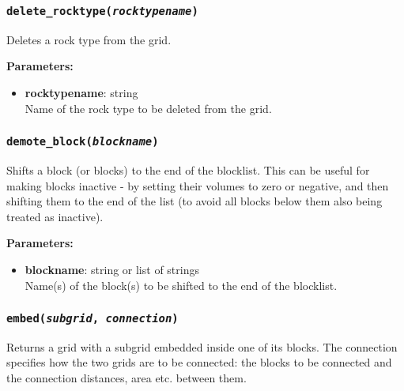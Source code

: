 \begin{snugshade}
\subsubsection{\texttt{delete\_rocktype(\emph{rocktypename})}}
\end{snugshade}
\label{sec:t2grid:delete_rocktype}

Deletes a rock type from the grid.

\textbf{Parameters:}
\begin{itemize}
\item \textbf{rocktypename}: string\\
  Name of the rock type to be deleted from the grid.
\end{itemize}

\begin{snugshade}
\subsubsection{\texttt{demote\_block(\emph{blockname})}}
\end{snugshade}
\label{sec:t2grid:demote_block}

Shifts a block (or blocks) to the end of the blocklist.  This can be useful for making blocks inactive - by setting their volumes to zero or negative, and then shifting them to the end of the list (to avoid all blocks below them also being treated as inactive).

\textbf{Parameters:}
\begin{itemize}
\item \textbf{blockname}: string or list of strings\\
  Name(s) of the block(s) to be shifted to the end of the blocklist.
\end{itemize}

\begin{snugshade}
\subsubsection{\texttt{embed(\emph{subgrid}, \emph{connection})}}
\end{snugshade}
\label{sec:t2grid:embed}

Returns a grid with a subgrid embedded inside one of its blocks.  The connection specifies how the two grids are to be connected: the blocks to be connected and the connection distances, area etc. between them.

